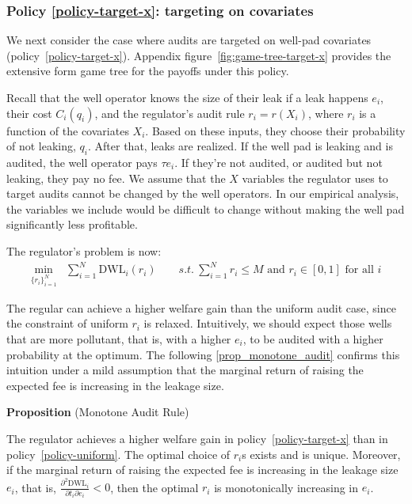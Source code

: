 \documentclass[12pt,oneside,letterpaper]{article}
\newcounter{propositioncounter}
\newlength{\premathenv}
\newlength{\withinmathenv}
\newlength{\postmathenv}
\theoremstyle{definition}
\newenvironment{proposition}[1]{%
\vspace{\premathenv}%
\refstepcounter{propositioncounter}%
\noindent\textbf{Proposition \thepropositioncounter}
{#1}
\vspace{\withinmathenv}
}{%
\vspace{\postmathenv}%
}
\begin{document}
\begin{refsection}
\subsubsection{Policy \ref{policy-target-x}: targeting on covariates}

We next consider the case where audits are targeted on well-pad covariates (policy~\ref{policy-target-x}).
Appendix figure~\ref{fig:game-tree-target-x} provides the extensive form game tree for the payoffs under this policy.

Recall that the well operator knows the size of their leak if a leak happens \(e_i\), their cost \(C_i(q_i)\), and the regulator's audit rule \(r_i = r(X_i)\), where \(r_i\) is a function of the covariates \(X_i\).
Based on these inputs, they choose their probability of not leaking, \(q_i\).
After that, leaks are realized.
If the well pad is leaking and is audited, the well operator pays \(\tau e_i\).
If they're not audited, or audited but not leaking, they pay no fee.
We assume that the \(X\) variables the regulator uses to target audits cannot be changed by the well operators.
In our empirical analysis, the variables we include would be difficult to change without making the well pad significantly less profitable.

The regulator's problem is now:
\begin{align*}
\min_{\{r_i\}^{N}_{i=1}} &  \sum^{N}_{i=1} \text{DWL}_i(r_i) \qquad
s.t.\ \sum^{N}_{i=1} r_i \leq M \text{ and } r_i \in [0, 1] \text{ for all } i
\end{align*}

The regular can achieve a higher welfare gain than the uniform audit case, since the constraint of uniform \(r_i\) is relaxed.
Intuitively, we should expect those wells that are more pollutant, that is, with a higher \(e_i\), to be audited with a higher probability at the optimum.
The following \autoref{prop_monotone_audit} confirms this intuition under a mild assumption that the marginal return of raising the expected fee is increasing in the leakage size.

\begin{proposition}{(Monotone Audit Rule)}
\label{prop_monotone_audit}

\noindent
The regulator achieves a higher welfare gain in policy~\ref{policy-target-x} than in policy~\ref{policy-uniform}.
The optimal choice of \(r_i\)s exists and is unique.
Moreover, if the marginal return of raising the expected fee is increasing in the leakage size \(e_i\), that is,
\(\frac{\partial^2 \text{DWL}_i}{\partial t_i \partial e_i} < 0\),
then the optimal \(r_i\) is monotonically increasing in \(e_i\).
\end{proposition}


\end{refsection}
\end{document}

